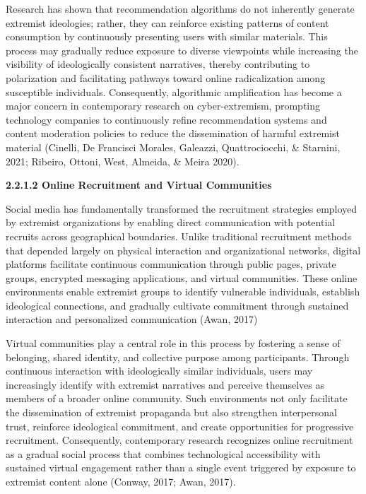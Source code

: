 \documentclass[11pt,a4paper]{article}
\begin{document}
	Research has shown that recommendation algorithms do not inherently generate extremist ideologies; rather, they can reinforce existing patterns of content consumption by continuously presenting users with similar materials. This process may gradually reduce exposure to diverse viewpoints while increasing the visibility of ideologically consistent narratives, thereby contributing to polarization and facilitating pathways toward online radicalization among susceptible individuals. Consequently, algorithmic amplification has become a major concern in contemporary research on cyber-extremism, prompting technology companies to continuously refine recommendation systems and content moderation policies to reduce the dissemination of harmful extremist material (Cinelli, De Francisci Morales, Galeazzi, Quattrociocchi, \& Starnini, 2021; Ribeiro, Ottoni, West, Almeida, \& Meira 2020).
	
	\textbf{2.2.1.2 Online Recruitment and Virtual Communities}
	
	Social media has fundamentally transformed the recruitment strategies employed by extremist organizations by enabling direct communication with potential recruits across geographical boundaries. Unlike traditional recruitment methods that depended largely on physical interaction and organizational networks, digital platforms facilitate continuous communication through public pages, private groups, encrypted messaging applications, and virtual communities. These online environments enable extremist groups to identify vulnerable individuals, establish ideological connections, and gradually cultivate commitment through sustained interaction and personalized communication (Awan, 2017)
	
	Virtual communities play a central role in this process by fostering a sense of belonging, shared identity, and collective purpose among participants. Through continuous interaction with ideologically similar individuals, users may increasingly identify with extremist narratives and perceive themselves as members of a broader online community. Such environments not only facilitate the dissemination of extremist propaganda but also strengthen interpersonal trust, reinforce ideological commitment, and create opportunities for progressive recruitment. Consequently, contemporary research recognizes online recruitment as a gradual social process that combines technological accessibility with sustained virtual engagement rather than a single event triggered by exposure to extremist content alone (Conway, 2017; Awan, 2017).
	
\end{document}
